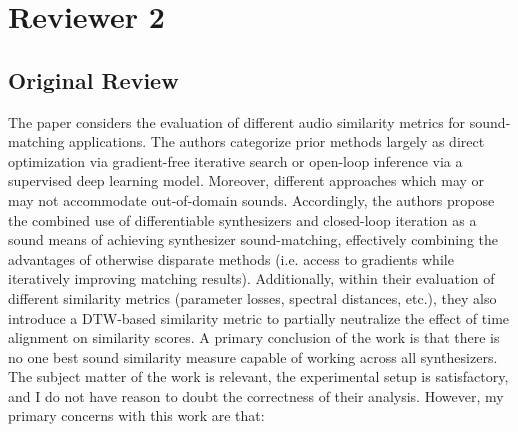 \documentclass[11pt]{article}
\begin{document}
\section{Reviewer 2}
\subsection{Original Review}
\noindent
The paper considers the evaluation of different audio similarity metrics for sound-matching applications.  The authors categorize prior methods largely as direct optimization via gradient-free iterative search or open-loop inference via a supervised deep learning model.  Moreover, different approaches which may or may not accommodate out-of-domain sounds.  Accordingly, the authors propose the combined use of differentiable synthesizers and closed-loop iteration as a sound means of achieving synthesizer sound-matching, effectively combining the advantages of otherwise disparate methods (i.e. access to gradients while iteratively improving matching results).  Additionally, within their evaluation of different similarity metrics (parameter losses, spectral distances, etc.), they also introduce a DTW-based similarity metric to partially neutralize the effect of time alignment on similarity scores.  A primary conclusion of the work is that there is no one best sound similarity measure capable of working across all synthesizers.  \\
The subject matter of the work is relevant, the experimental setup is satisfactory, and I do not have reason to doubt the correctness of their analysis.  However, my primary concerns with this work are that:  
\end{document}
